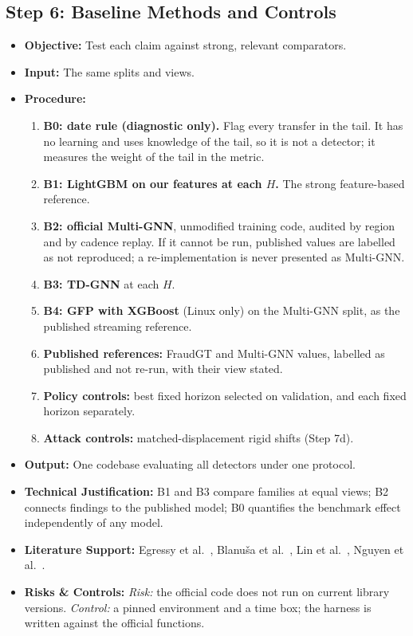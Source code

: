 \documentclass[11pt,a4paper]{article}
\begin{document}
\subsection{Step 6: Baseline Methods and Controls}
\begin{itemize}[leftmargin=*]
    \item \textbf{Objective:} Test each claim against strong, relevant comparators.
    \item \textbf{Input:} The same splits and views.
    \item \textbf{Procedure:}
    \begin{enumerate}[leftmargin=*]
        \item \textbf{B0: date rule (diagnostic only).} Flag every transfer in the tail. It has no learning and uses knowledge of the tail, so it is not a detector; it measures the weight of the tail in the metric.
        \item \textbf{B1: LightGBM on our features at each $H$.} The strong feature-based reference.
        \item \textbf{B2: official Multi-GNN}, unmodified training code, audited by region and by cadence replay. If it cannot be run, published values are labelled as not reproduced; a re-implementation is never presented as Multi-GNN.
        \item \textbf{B3: TD-GNN} at each $H$.
        \item \textbf{B4: GFP with XGBoost} \cite{blanusa2024gfp} (Linux only) on the Multi-GNN split, as the published streaming reference.
        \item \textbf{Published references:} FraudGT and Multi-GNN values, labelled as published and not re-run, with their view stated.
        \item \textbf{Policy controls:} best fixed horizon selected on validation, and each fixed horizon separately.
        \item \textbf{Attack controls:} matched-displacement rigid shifts (Step 7d).
    \end{enumerate}
    \item \textbf{Output:} One codebase evaluating all detectors under one protocol.
    \item \textbf{Technical Justification:} B1 and B3 compare families at equal views; B2 connects findings to the published model; B0 quantifies the benchmark effect independently of any model.
    \item \textbf{Literature Support:} Egressy et al.\ \cite{egressy2024multigraph}, Blanu\v{s}a et al.\ \cite{blanusa2024gfp}, Lin et al.\ \cite{lin2024fraudgt}, Nguyen et al.\ \cite{nguyen2022future}.
    \item \textbf{Risks \& Controls:} \textit{Risk:} the official code does not run on current library versions. \textit{Control:} a pinned environment and a time box; the harness is written against the official functions.
\end{itemize}
\end{document}
